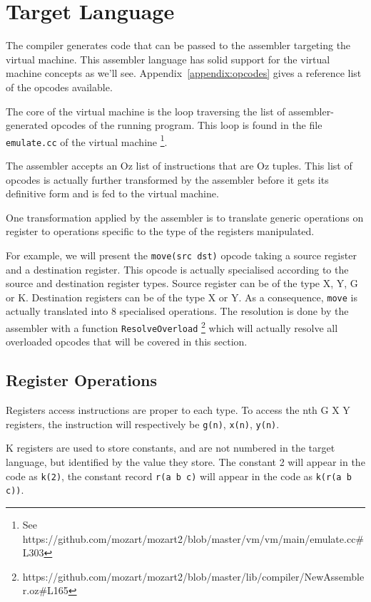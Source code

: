 \documentclass[a4paper]{memoir}
\begin{document}
\section{Target Language}
The compiler generates code that can be passed to the assembler targeting the
virtual machine. This assembler language has solid support for the virtual
machine concepts as we'll see. Appendix~\ref{appendix:opcodes} gives a reference list of
the opcodes available.

The core of the virtual machine is the loop traversing the list of
assembler-generated opcodes of the running program. This loop is found in the file
\lstinline!emulate.cc! of the virtual
machine \cite{Moz2vmsrc} \footnote{See
https://github.com/mozart/mozart2/blob/master/vm/vm/main/emulate.cc\#L303}.

The assembler accepts an Oz list of instructions that are Oz tuples. This list
of opcodes is actually further transformed by
the assembler before it gets its definitive form and is fed to the virtual
machine.                                             

One transformation applied by the assembler is to translate generic operations
on register to operations specific to the type of the registers manipulated. 

For example, we will present the \lstinline!move(src dst)! opcode taking a
source register and a destination register. This opcode is actually
specialised according to the source and destination register types. Source
register can be of the type X, Y, G or K. Destination registers can be of the
type X or Y. As a consequence, \lstinline!move! is actually translated into
8 specialised operations. The resolution is done by the
assembler with a function
\lstinline!ResolveOverload! \cite{Moz2src}\footnote{https://github.com/mozart/mozart2/blob/master/lib/compiler/NewAssembler.oz\#L165} 
which will actually resolve all overloaded opcodes that will be covered in this section. 

\subsection{Register Operations}\label{sec:intro:opcode:registers}
Registers access instructions are proper to each type. To access the nth G X Y
registers, the instruction will respectively be \lstinline!g(n)!,
\lstinline!x(n)!, \lstinline!y(n)!. 

K registers are used to store constants, and are not numbered in the target
language, but identified by
the value they store. The constant 2 will appear in the code as
\lstinline!k(2)!, the constant record \lstinline!r(a b c)! will appear in the
code as \lstinline!k(r(a b c))!.
\end{document}
